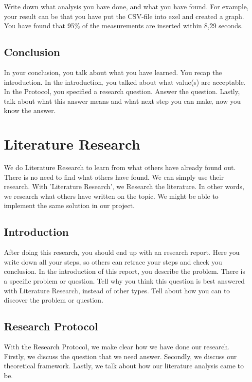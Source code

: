 \documentclass[10pt]{report}
\begin{document}
Write down what analysis you have done, and what you have found. For example, your result can be that you have put the CSV-file into exel and created a graph. You have found that 95\% of the measurements are inserted within 8,29 seconds.

\subsection{Conclusion}

In your conclusion, you talk about what you have learned. You recap the introduction. In the introduction, you talked about what value(s) are acceptable. In the Protocol, you specified a research question. Answer the question. Lastly, talk about what this answer means and what next step you can make, now you know the answer.

\newpage

\section{Literature Research}

We do Literature Research to learn from what others have already found out. There is no need to find what others have found. We can simply use their research. With 'Literature Research', we Research the literature. In other words, we research what others have written on the topic. We might be able to implement the same solution in our project.

\subsection{Introduction}

After doing this research, you should end up with an research report. Here you write down all your steps, so others can retrace your steps and check you conclusion. In the introduction of this report, you describe the problem. There is a specific problem or question. Tell why you think this question is best answered with Literature Research, instead of other types. Tell about how you can to discover the problem or question.

\subsection{Research Protocol}

With the Research Protocol, we make clear how we have done our research. Firstly, we discuss the question that we need answer. Secondly, we discuss our theoretical framework. Lastly, we talk about how our literature analysis came to be.
\end{document}
